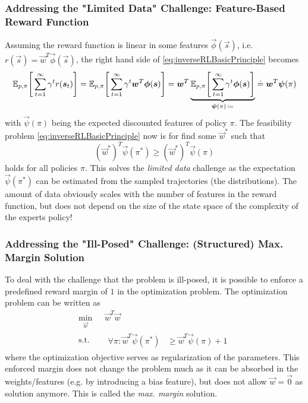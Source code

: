 			\subsubsection{Addressing the "Limited Data" Challenge: Feature-Based Reward Function}
				Assuming the reward function is linear in some features \( \vec{\phi}(\vec{s}) \), i.e. \( r(\vec{s}) = \vec{w}^T \vec{\phi}(\vec{s}) \), the right hand side of \eqref{eq:inverseRLBasicPrinciple} becomes
				\begin{equation*}
					\mathbb{E}_{p, \pi}\Bigg[ \sum_{t = 1}^{\infty} \gamma^t r(\bm{s}_t) \Bigg]
						= \mathbb{E}_{p, \pi}\Bigg[ \sum_{t = 1}^{\infty} \gamma^t \bm{w}^T \bm{\phi}(\bm{s}) \Bigg]
						= \bm{w}^T \underbrace{\mathbb{E}_{p, \pi}\Bigg[ \sum_{t = 1}^{\infty} \gamma^t \bm{\phi}(\bm{s}) \Bigg]}_{\bm{\psi}(\pi) \,\coloneqq}
						\doteq \bm{w}^T \bm{\psi}(\pi)
				\end{equation*}
				with \( \vec{\psi}(\pi) \) being the expected discounted features of policy \(\pi\). The feasibility problem \eqref{eq:inverseRLBasicPrinciple} now is for find some \( \vec{w}^\ast \) such that
				\begin{equation*}
					(\vec{w}^\ast)^T \vec{\psi}(\pi^\ast) \geq (\vec{w}^\ast)^T \vec{\psi}(\pi)
				\end{equation*}
				holds for all policies \(\pi\). This solves the \emph{limited data} challenge as the expectation \( \vec{\psi}(\pi^\ast) \) can be estimated from the sampled trajectories (the distributions). The amount of data obviously scales with the number of features in the reward function, but does not depend on the size of the state space of the complexity of the experts policy!

			\subsubsection{Addressing the "Ill-Posed" Challenge: (Structured) Max. Margin Solution}
				To deal with the challenge that the problem is ill-posed, it is possible to enforce a predefined reward margin of \(1\) in the optimization problem. The optimization problem can be written as
				\begin{equation*}
					\begin{aligned}
						\min_{\vec{w}} \,& \vec{w}^T \vec{w} \\
						\mathrm{s.t.} \quad&
							\begin{aligned}
								\forall\pi : \vec{w}^T \vec{\psi}(\pi^\ast) &\geq \vec{w}^T \vec{\psi}(\pi) + 1
							\end{aligned}
					\end{aligned}
				\end{equation*}
				where the optimization objective serves as regularization of the parameters. This enforced margin does not change the problem much as it can be absorbed in the weights/features (e.g. by introducing a bias feature), but does not allow \( \vec{w} = \vec{0} \) as solution anymore. This is called the \emph{max. margin} solution.

